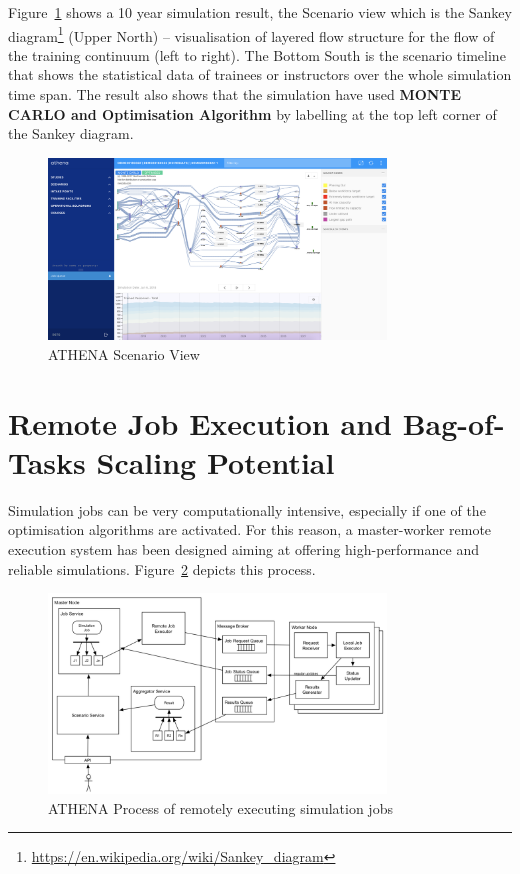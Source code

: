 Figure~\ref{fig:scenarioScreen} shows a 10 year simulation result, the Scenario view which is the Sankey diagram\footnote{\url{https://en.wikipedia.org/wiki/Sankey_diagram}} (Upper North) -- visualisation of layered flow structure for the flow of the training continuum (left to right). The Bottom South is the scenario timeline that shows the statistical data of trainees or instructors over the whole simulation time span. The result also shows that the simulation have used \textbf{MONTE CARLO and Optimisation Algorithm} by labelling at the top left corner of the Sankey diagram.

\begin{figure}
\centering
\includegraphics[width=0.8\textwidth]{Figures/ATHENA_scenario_screen}
\decoRule
\caption[ATHENA Scenario View]{ATHENA Scenario View}
\label{fig:scenarioScreen}
\end{figure}

\section{Remote Job Execution and Bag-of-Tasks Scaling Potential}

Simulation jobs can be very computationally intensive, especially if one of the optimisation algorithms are activated. For this reason, a master-worker remote execution system has been designed aiming at offering high-performance and reliable simulations. Figure~\ref{fig:remoteJob} depicts this process.

\begin{figure}
\centering
\includegraphics[width=0.8\textwidth]{Figures/ATHENA_remote_job_exec}
\decoRule
\caption[ATHENA Remote Job Execution]{ATHENA Process of remotely executing simulation jobs}
\label{fig:remoteJob}
\end{figure}

